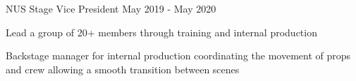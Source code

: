 

\begin{cventries}

  \cventry
    {NUS Stage} %
    {Vice President} %
    {} %
    {May 2019 - May 2020} %
    {
      \begin{cvitems} %
        \item {Lead a group of 20+ members through training and internal production}
        \item {Backstage manager for internal production coordinating the movement of props and crew allowing a smooth transition between scenes}
      \end{cvitems}
    }

\end{cventries}
